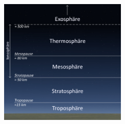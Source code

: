 \documentclass{beamer}
\begin{document}
\begin{frame}
    \begin{center}
        \includegraphics[height=6.0cm]{img/Bild_2.jpg}\\
        \begin{block}{}
        \end{block}
    \end{center}
\end{frame}

\begin{frame}
    \begin{columns}
    \end{columns}
    \begin{block}{}
    \end{block}
\end{frame}
\end{document}
